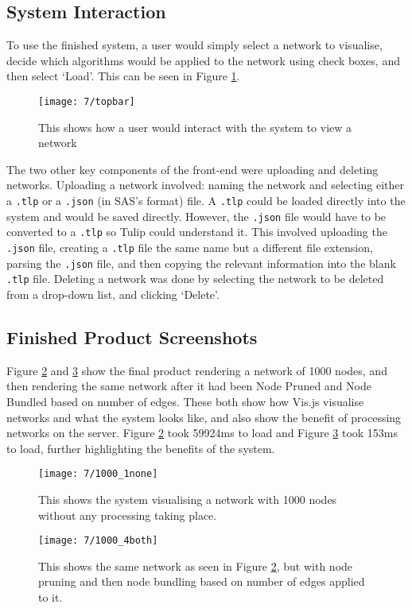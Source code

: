 \documentclass[../dissertation.tex]{subfiles}
\begin{document}
\subsection{System Interaction}

To use the finished system, a user would simply select a network to visualise, decide which algorithms would be applied to the network using check boxes, and then select `Load'. This can be seen in Figure \ref{fig:topbar}.

\begin{figure}[H]
    \centering
    \texttt{[image: 7/topbar]}
    \caption{This shows how a user would interact with the system to view a network}
    \label{fig:topbar}
\end{figure}

The two other key components of the front-end were uploading and deleting networks. Uploading a network involved: naming the network and selecting either a \texttt{.tlp} or a \texttt{.json} (in SAS's format) file. A \texttt{.tlp} could be loaded directly into the system and would be saved directly. However, the \texttt{.json} file would have to be converted to a \texttt{.tlp} so Tulip could understand it. This involved uploading the \texttt{.json} file, creating a \texttt{.tlp} file the same name but a different file extension, parsing the \texttt{.json} file, and then copying the relevant information into the blank \texttt{.tlp} file. Deleting a network was done by selecting the network to be deleted from a drop-down list, and clicking `Delete'.

\subsection{Finished Product Screenshots}

Figure \ref{fig:1000-none} and \ref{fig:1000-both} show the final product rendering a network of 1000 nodes, and then rendering the same network after it had been Node Pruned and Node Bundled based on number of edges. These both show how Vis.js visualise networks and what the system looks like, and also show the benefit of processing networks on the server. Figure \ref{fig:1000-none} took 59924ms to load and Figure \ref{fig:1000-both} took 153ms to load, further highlighting the benefits of the system.

\begin{figure}[H]
    \centering
    \texttt{[image: 7/1000\_1none]}
    \caption{This shows the system visualising a network with 1000 nodes without any processing taking place.}
    \label{fig:1000-none}
\end{figure}

\begin{figure}[H]
    \centering
    \texttt{[image: 7/1000\_4both]}
    \caption{This shows the same network as seen in Figure \ref{fig:1000-none}, but with node pruning and then node bundling based on number of edges applied to it.}
    \label{fig:1000-both}
\end{figure}
\end{document}

